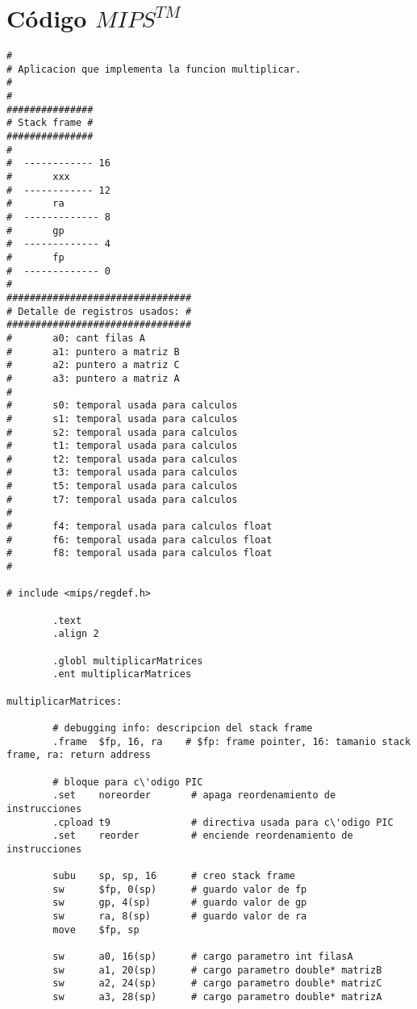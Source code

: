 \documentclass[a4paper,10pt]{article}
\begin{document}
\section{C\'odigo $MIPS^{TM}$}
\lstset{language=[mips]Assembler}
\begin{lstlisting}
#
# Aplicacion que implementa la funcion multiplicar.
#
#
###############
# Stack frame #
###############
#
#  ------------ 16
#       xxx
#  ------------ 12
#       ra
#  ------------- 8
#       gp
#  ------------- 4
#       fp
#  ------------- 0
#
################################
# Detalle de registros usados: #
################################
#       a0: cant filas A
#       a1: puntero a matriz B
#       a2: puntero a matriz C
#       a3: puntero a matriz A
#
#       s0: temporal usada para calculos
#       s1: temporal usada para calculos
#       s2: temporal usada para calculos
#       t1: temporal usada para calculos
#       t2: temporal usada para calculos
#       t3: temporal usada para calculos
#       t5: temporal usada para calculos
#       t7: temporal usada para calculos
#
#       f4: temporal usada para calculos float
#       f6: temporal usada para calculos float
#       f8: temporal usada para calculos float
#       

# include <mips/regdef.h>

        .text
        .align 2

        .globl multiplicarMatrices
        .ent multiplicarMatrices

multiplicarMatrices:

        # debugging info: descripcion del stack frame
        .frame  $fp, 16, ra    # $fp: frame pointer, 16: tamanio stack frame, ra: return address
        
        # bloque para c\'odigo PIC
        .set    noreorder       # apaga reordenamiento de instrucciones
        .cpload t9              # directiva usada para c\'odigo PIC
        .set    reorder         # enciende reordenamiento de instrucciones

        subu    sp, sp, 16      # creo stack frame
        sw      $fp, 0(sp)      # guardo valor de fp
        sw      gp, 4(sp)       # guardo valor de gp
        sw      ra, 8(sp)       # guardo valor de ra
        move    $fp, sp

        sw      a0, 16(sp)      # cargo parametro int filasA
        sw      a1, 20(sp)      # cargo parametro double* matrizB
        sw      a2, 24(sp)      # cargo parametro double* matrizC
        sw      a3, 28(sp)      # cargo parametro double* matrizA



\end{lstlisting}
\end{document}
